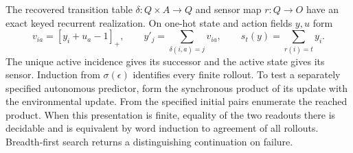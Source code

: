 \documentclass[11pt,a4paper]{article}
\theoremstyle{definition}
\theoremstyle{remark}\newaliascnt{remark}{theorem}
\numberwithin{equation}{section}
\begin{document}
The recovered transition table $\delta:Q\times A\to Q$ and sensor map $r:Q\to O$ have an exact keyed recurrent realization. On one-hot state and action fields $y,u$ form
\[
 v_{ia}=[y_i+u_a-1]_+,\qquad
 y'_j=\sum_{\delta(i,a)=j}v_{ia},\qquad
 s_t(y)=\sum_{r(i)=t}y_i .
\]
The unique active incidence gives its successor and the active state gives its sensor. Induction from $\sigma(\epsilon)$ identifies every finite rollout. To test a separately specified autonomous predictor, form the synchronous product of its update with the environmental update. From the specified initial pairs enumerate the reached product. When this presentation is finite, equality of the two readouts there is decidable and is equivalent by word induction to agreement of all rollouts. Breadth-first search returns a distinguishing continuation on failure.
\end{document}
